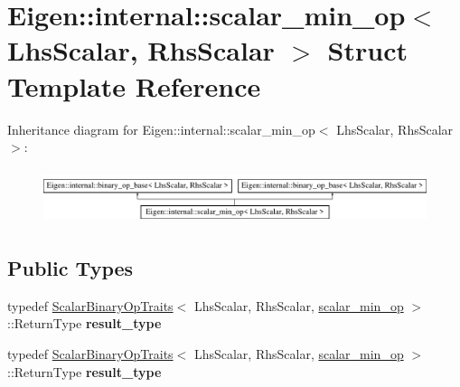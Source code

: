 \hypertarget{struct_eigen_1_1internal_1_1scalar__min__op}{}\section{Eigen\+:\+:internal\+:\+:scalar\+\_\+min\+\_\+op$<$ Lhs\+Scalar, Rhs\+Scalar $>$ Struct Template Reference}
\label{struct_eigen_1_1internal_1_1scalar__min__op}
Inheritance diagram for Eigen\+:\+:internal\+:\+:scalar\+\_\+min\+\_\+op$<$ Lhs\+Scalar, Rhs\+Scalar $>$\+:\begin{figure}[H]
\begin{center}
\leavevmode
\includegraphics[height=1.623188cm]{struct_eigen_1_1internal_1_1scalar__min__op}
\end{center}
\end{figure}
\subsection*{Public Types}
\begin{DoxyCompactItemize}
\item 
\mbox{\label{struct_eigen_1_1internal_1_1scalar__min__op_a31cf08569729e409dad71f1eb04a13ef}} 
typedef \hyperlink{group___core___module_struct_eigen_1_1_scalar_binary_op_traits}{Scalar\+Binary\+Op\+Traits}$<$ Lhs\+Scalar, Rhs\+Scalar, \hyperlink{struct_eigen_1_1internal_1_1scalar__min__op}{scalar\+\_\+min\+\_\+op} $>$\+::Return\+Type {\bfseries result\+\_\+type}
\item 
\mbox{\label{struct_eigen_1_1internal_1_1scalar__min__op_a31cf08569729e409dad71f1eb04a13ef}} 
typedef \hyperlink{group___core___module_struct_eigen_1_1_scalar_binary_op_traits}{Scalar\+Binary\+Op\+Traits}$<$ Lhs\+Scalar, Rhs\+Scalar, \hyperlink{struct_eigen_1_1internal_1_1scalar__min__op}{scalar\+\_\+min\+\_\+op} $>$\+::Return\+Type {\bfseries result\+\_\+type}
\end{DoxyCompactItemize}

